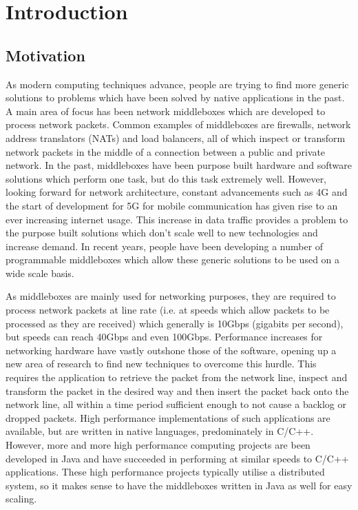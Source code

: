 \documentclass[final_report.tex]{subfiles}
\begin{document}
\section{Introduction}

\subsection{Motivation}
As modern computing techniques advance, people are trying to find more generic solutions to problems which have been solved by native applications in the past. A main area of focus has been network middleboxes which are developed to process network packets. Common examples of middleboxes are firewalls, network address translators (NATs) and load balancers, all of which inspect or transform network packets in the middle of a connection between a public and private network. In the past, middleboxes have been purpose built hardware and software solutions which perform one task, but do this task extremely well. However, looking forward for network architecture, constant advancements such as 4G and the start of development for 5G for mobile communication has given rise to an ever increasing internet usage. This increase in data traffic provides a problem to the purpose built solutions which don't scale well to new technologies and increase demand. In recent years, people have been developing a number of programmable middleboxes which allow these generic solutions to be used on a wide scale basis.

As middleboxes are mainly used for networking purposes, they are required to process network packets at line rate (i.e. at speeds which allow packets to be processed as they are received) which generally is 10Gbps (gigabits per second), but speeds can reach 40Gbps and even 100Gbps. Performance increases for networking hardware have vastly outshone those of the software, opening up a new area of research to find new techniques to overcome this hurdle. This requires the application to retrieve the packet from the network line, inspect and transform the packet in the desired way and then insert the packet back onto the network line, all within a time period sufficient enough to not cause a backlog or dropped packets. High performance implementations of such applications are available, but are written in native languages, predominately in C/C++. However, more and more high performance computing projects are been developed in Java and have succeeded in performing at similar speeds to C/C++ applications. These high performance projects typically utilise a distributed system, so it makes sense to have the middleboxes written in Java as well for easy scaling.
\end{document}
